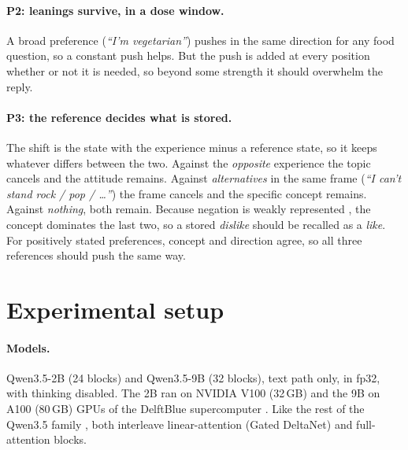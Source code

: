 \documentclass[11pt]{article}
\begin{document}
\paragraph{P2: leanings survive, in a dose window.} A broad preference (\textit{``I'm vegetarian''}) pushes in the same direction for any food question, so a constant push helps. But the push is added at every position whether or not it is needed, so beyond some strength it should overwhelm the reply.

\paragraph{P3: the reference decides what is stored.} The shift is the state with the experience minus a reference state, so it keeps whatever differs between the two. Against the \emph{opposite} experience the topic cancels and the attitude remains. Against \emph{alternatives} in the same frame (\textit{``I can't stand rock / pop / \ldots''}) the frame cancels and the specific concept remains. Against \emph{nothing}, both remain. Because negation is weakly represented \citep{jang2023negated,lindsey2026introspection}, the concept dominates the last two, so a stored \emph{dislike} should be recalled as a \emph{like}. For positively stated preferences, concept and direction agree, so all three references should push the same way.

\section{Experimental setup}
\label{sec:setup}

\paragraph{Models.} Qwen3.5-2B (24 blocks) and Qwen3.5-9B (32 blocks), text path only, in fp32, with thinking disabled. The 2B ran on NVIDIA V100 (32\,GB) and the 9B on A100 (80\,GB) GPUs\ifdefined\REVIEW\else{} of the DelftBlue supercomputer \citep{DHPC2024}\fi. Like the rest of the Qwen3.5 family \citep{qwen2026omni}, both interleave linear-attention (Gated DeltaNet) and full-attention blocks.
\end{document}

